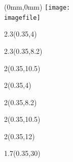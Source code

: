 \begin{textblock*}{\paperwidth}(0mm,0mm)
  \texttt{[image: \\imagefile]}
\end{textblock*}

\begin{textblock*}{2.3\TPHorizModule}(0.35\TPHorizModule,4\TPVertModule)
  \textcolor{white}{\titlefmt}
\end{textblock*}

\begin{textblock*}{2.3\TPHorizModule}(0.35\TPHorizModule,8.2\TPVertModule)
  \textcolor{white}{\parttitlefmt}
\end{textblock*}

\begin{textblock*}{2\TPHorizModule}(0.35\TPHorizModule,10.5\TPVertModule)
  \textcolor{white}{\authorfmt}
\end{textblock*}

\null\cleardoublepage


\begin{textblock*}{2\TPHorizModule}(0.35\TPHorizModule,4\TPVertModule)
  \titlefmt
\end{textblock*}

\begin{textblock*}{2\TPHorizModule}(0.35\TPHorizModule,8.2\TPVertModule)
  \parttitlefmt
\end{textblock*}

\begin{textblock*}{2\TPHorizModule}(0.35\TPHorizModule,10.5\TPVertModule)
  \authorfmt
\end{textblock*}

\begin{textblock*}{2\TPHorizModule}(0.35\TPHorizModule,12\TPVertModule)
  \affiliation
\end{textblock*}

\begin{textblock*}{1.7\TPHorizModule}(0.35\TPHorizModule,30\TPVertModule)
  \edition
\end{textblock*}
\endgroup
